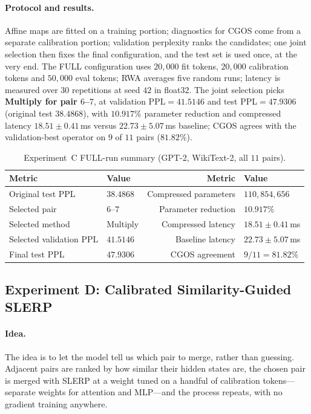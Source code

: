 \documentclass[10pt,a4paper]{article}
\begin{document}
\paragraph{Protocol and results.} Affine maps are fitted on a training portion;
diagnostics for CGOS come from a separate calibration portion; validation
perplexity ranks the candidates; one joint selection then fixes the final
configuration, and the test set is used once, at the very end. The FULL
configuration uses $20{,}000$ fit tokens, $20{,}000$ calibration tokens and
$50{,}000$ eval tokens; RWA averages five random runs; latency is measured over
$30$ repetitions at seed $42$ in float32. The joint selection picks
\textbf{Multiply for pair $6$--$7$}, at validation $\mathrm{PPL}=41.5146$ and
test $\mathrm{PPL}=47.9306$ (original test $38.4868$), with $10.917\%$ parameter
reduction and compressed latency $18.51\pm0.41$\,ms versus $22.73\pm5.07$\,ms
baseline; CGOS agrees with the validation-best operator on $9$ of $11$ pairs
($81.82\%$).

\begin{table}[t]
\centering
\small
\begin{tabular}{llrl}
\toprule
Metric & Value & Metric & Value \\
\midrule
Original test PPL & $38.4868$ & Compressed parameters & $110{,}854{,}656$ \\
Selected pair & $6$--$7$ & Parameter reduction & $10.917\%$ \\
Selected method & Multiply & Compressed latency & $18.51\pm0.41$\,ms \\
Selected validation PPL & $41.5146$ & Baseline latency & $22.73\pm5.07$\,ms \\
Final test PPL & $47.9306$ & CGOS agreement & $9/11 = 81.82\%$ \\
\bottomrule
\end{tabular}
\caption{Experiment~C FULL-run summary (GPT-2, WikiText-2, all $11$ pairs).}
\label{tab:lingala}
\end{table}

\subsection{Experiment D: Calibrated Similarity-Guided SLERP}
\label{sec:expD}

\paragraph{Idea.} The idea is to let the model tell us which pair to merge,
rather than guessing. Adjacent pairs are ranked by how similar their hidden
states are, the chosen pair is merged with SLERP at a weight tuned on a handful
of calibration tokens---separate weights for attention and MLP---and the
process repeats, with no gradient training anywhere.
\end{document}
